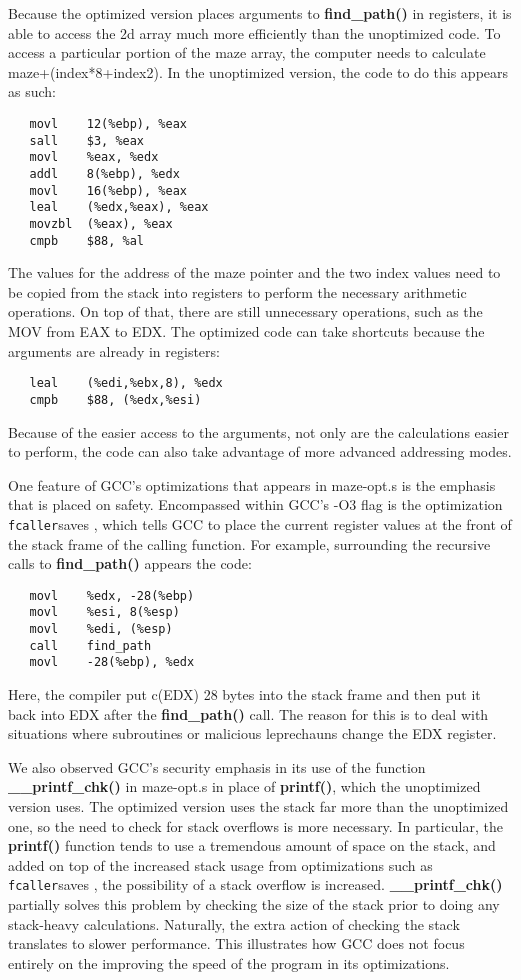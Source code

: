 \documentclass[12pt,letterpaper]{article}
\begin{document}
Because the optimized version places arguments to {\bf find\_path()} 
in registers, it is able to access the 2d array much more efficiently 
than the unoptimized code. To access a particular portion of the maze array, 
the computer needs to calculate maze+(index*8+index2). In the unoptimized 
version, the code to do this appears as such:
\begin{verbatim}
   movl    12(%ebp), %eax
   sall    $3, %eax
   movl    %eax, %edx
   addl    8(%ebp), %edx
   movl    16(%ebp), %eax
   leal    (%edx,%eax), %eax
   movzbl  (%eax), %eax
   cmpb    $88, %al
\end{verbatim}
The values for the address of the maze pointer and the two index values 
need to be copied from the stack into registers to perform the necessary 
arithmetic operations. On top of that, there are still unnecessary 
operations, such as the MOV from EAX to EDX. The optimized code can 
take shortcuts because the arguments are already in registers:
\begin{verbatim}
   leal    (%edi,%ebx,8), %edx
   cmpb    $88, (%edx,%esi)
\end{verbatim}
Because of the easier access to the arguments, not only are the 
calculations easier to perform, the code can also take advantage 
of more advanced addressing modes.

One feature of GCC's optimizations that appears in maze-opt.s is the 
emphasis that is placed on safety. Encompassed within GCC's -O3 flag 
is the optimization \verb -fcaller-saves , which tells GCC to place 
the current register values at the front of the stack frame of the 
calling function. For example, surrounding the recursive calls 
to {\bf find\_path()} appears the code:
\begin{verbatim}
   movl    %edx, -28(%ebp)
   movl    %esi, 8(%esp)
   movl    %edi, (%esp)
   call    find_path
   movl    -28(%ebp), %edx
\end{verbatim}
Here, the compiler put c(EDX) 28 bytes into the stack frame and then 
put it back into EDX after the {\bf find\_path()} call. The reason for this 
is to deal with situations where subroutines or malicious leprechauns change 
the EDX register.

We also observed GCC’s security emphasis in its use of the function 
{\bf \_\_printf\_chk()} in maze-opt.s in place of {\bf printf()},
which the unoptimized version uses. The optimized version uses the 
stack far more than the unoptimized one, so the need to check for 
stack overflows is more necessary. In particular, the {\bf printf()} 
function tends to use a tremendous amount of space on the stack, and 
added on top of the increased stack usage from optimizations such as 
\verb -fcaller-saves , the possibility of a stack overflow is increased. 
{\bf \_\_printf\_chk()} partially solves this problem by  checking the size 
of the stack prior to doing any stack-heavy calculations. Naturally, 
the extra action of checking the stack translates to slower performance. 
This illustrates how GCC does not focus entirely on the improving the speed 
of the program in its optimizations.
\end{document}
